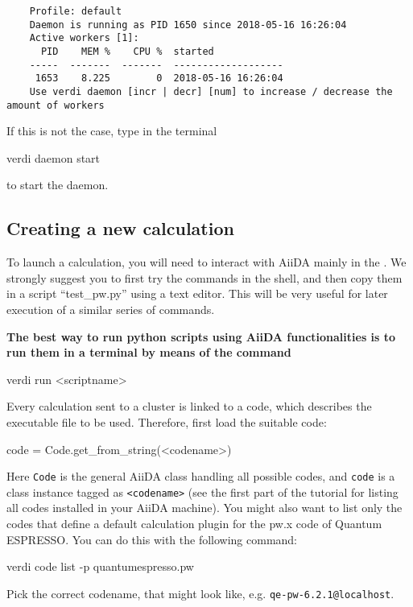 \begin{verbatim}
    Profile: default
    Daemon is running as PID 1650 since 2018-05-16 16:26:04
    Active workers [1]:
      PID    MEM %    CPU %  started
    -----  -------  -------  -------------------
     1653    8.225        0  2018-05-16 16:26:04
    Use verdi daemon [incr | decr] [num] to increase / decrease the amount of workers
\end{verbatim}
If this is not the case, type in the terminal
\begin{bashcommand}
verdi daemon start
\end{bashcommand}
to start the daemon.


\subsection{Creating a new calculation\label{sec:create_calc}}
To launch a calculation, you will need to interact with AiiDA mainly in the .
We strongly suggest you to first try the commands in the shell, and then copy them in a script ``test\_pw.py'' using a text editor. This will be very useful for later execution of a similar series of commands.

\textbf{The best way to run python scripts using AiiDA functionalities is to run them in a terminal by means of the command}
\begin{bashcommand}
 verdi run <scriptname>
\end{bashcommand}

Every calculation sent to a cluster is linked to a code, which describes the executable file to be used.
Therefore, first load the suitable code:
\begin{pythoncommand}
 code = Code.get_from_string(<codename>)
\end{pythoncommand}
Here \texttt{Code} is the general AiiDA class handling all possible codes, and \texttt{code} is a class instance tagged as \texttt{<codename>} (see the first part of the tutorial for listing all codes installed in your AiiDA machine).
You might also want to list only the codes that define a default calculation plugin for the pw.x code of Quantum ESPRESSO. You can do this with the following command:
\begin{bashcommand}
verdi code list -p quantumespresso.pw
\end{bashcommand}
Pick the correct codename, that might look like, e.g. \texttt{qe-pw-6.2.1@localhost}.

